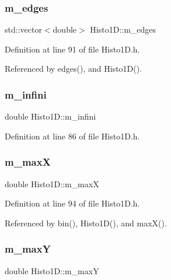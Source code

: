 \subsubsection{\texorpdfstring{m\+\_\+edges}{m\_edges}}
{\footnotesize\ttfamily std\+::vector$<$double$>$ Histo1\+D\+::m\+\_\+edges\hspace{0.3cm}{\ttfamily [private]}}



Definition at line 91 of file Histo1\+D.\+h.



Referenced by edges(), and Histo1\+D().

\mbox{\label{classHisto1D_a47c1ba33be0574ca167f43a1b27ba1a0}} 
\subsubsection{\texorpdfstring{m\+\_\+infini}{m\_infini}}
{\footnotesize\ttfamily double Histo1\+D\+::m\+\_\+infini\hspace{0.3cm}{\ttfamily [private]}}



Definition at line 86 of file Histo1\+D.\+h.

\mbox{\label{classHisto1D_a6a5007569e096537f9b7b39d2aad865b}} 
\subsubsection{\texorpdfstring{m\+\_\+maxX}{m\_maxX}}
{\footnotesize\ttfamily double Histo1\+D\+::m\+\_\+maxX\hspace{0.3cm}{\ttfamily [private]}}



Definition at line 94 of file Histo1\+D.\+h.



Referenced by bin(), Histo1\+D(), and max\+X().

\mbox{\label{classHisto1D_a28a8995424e36088c47643f8c1a7fa7f}} 
\subsubsection{\texorpdfstring{m\+\_\+maxY}{m\_maxY}}
{\footnotesize\ttfamily double Histo1\+D\+::m\+\_\+maxY\hspace{0.3cm}{\ttfamily [private]}}



